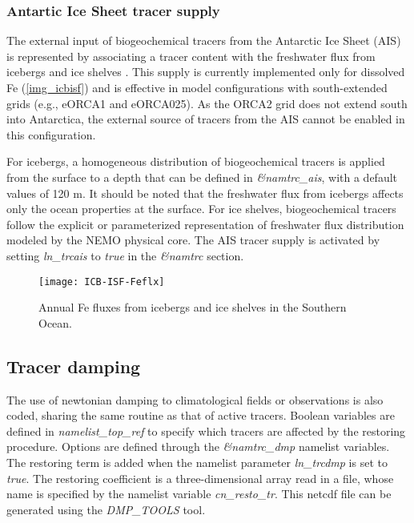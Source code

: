 \documentclass[../main/TOP_manual]{subfiles}
\begin{document}

\subsubsection{Antartic Ice Sheet tracer supply}

The external input of biogeochemical tracers from the Antarctic Ice Sheet (AIS) is represented by associating a tracer content with the freshwater flux from icebergs and ice shelves \citep{person_sensitivity_2019}. This supply is currently implemented only for dissolved Fe (\autoref{img_icbisf}) and is effective in model configurations with south-extended grids (e.g., eORCA1 and eORCA025). As the ORCA2 grid does not extend south into Antarctica, the external source of tracers from the AIS cannot be enabled in this configuration. 

For icebergs, a homogeneous distribution of biogeochemical tracers is applied from the surface to a depth that can be defined in \textit{\&namtrc\_ais}, with a default values of 120 m. It should be noted that the freshwater flux from icebergs affects only the ocean properties at the surface. For ice shelves, biogeochemical tracers follow the explicit or parameterized representation of freshwater flux distribution modeled by the NEMO physical core. The AIS tracer supply is activated by setting \textit{ln\_trcais} to \textit{true} in the \textit{\&namtrc} section.

\begin{figure}[!h]
	\centering
	\texttt{[image: ICB-ISF-Feflx]}
	\caption{Annual Fe fluxes from icebergs and ice shelves in the Southern Ocean.}
	\label{img_icbisf}
\end{figure}


\subsection{Tracer damping}

The use of newtonian damping  to climatological fields or observations is also coded, sharing the same routine as that of active tracers.
Boolean variables are defined in \textit{namelist\_top\_ref} to specify which tracers are affected by the restoring procedure.
Options are defined through the \textit{\&namtrc\_dmp} namelist variables.
The restoring term is added when the namelist parameter \textit{ln\_trcdmp} is set to \textit{true}.
The restoring coefficient is a three-dimensional array read in a file, whose name is specified by the namelist variable \textit{cn\_resto\_tr}.
This netcdf file can be generated using the \textit{DMP\_TOOLS} tool.
\end{document}
